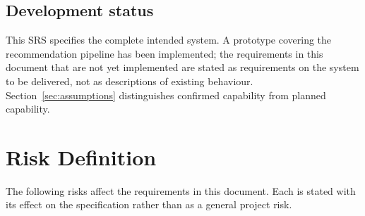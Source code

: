 \documentclass[11pt,a4paper]{report}
\begin{document}
\subsection*{Development status}
This SRS specifies the complete intended system. A prototype covering the recommendation
pipeline has been implemented; the requirements in this document that are not yet
implemented are stated as requirements on the system to be delivered, not as descriptions of
existing behaviour. Section~\ref{sec:assumptions} distinguishes confirmed capability from
planned capability.

\section{Risk Definition}
\label{sec:risks}
The following risks affect the requirements in this document. Each is stated with its effect
on the specification rather than as a general project risk.
\end{document}
